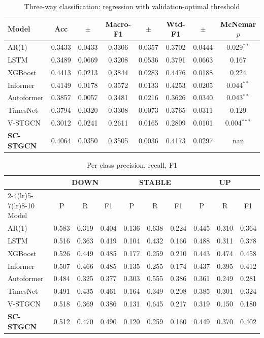 
\begin{table}[ht]\centering
\caption{Three-way classification: regression with validation-optimal threshold}
\label{tab:clf3opt}
\begin{tabular}{lccccccc}\toprule
Model & Acc & $\pm$ & Macro-F1 & $\pm$ & Wtd-F1 & $\pm$ & McNemar $p$ \\\midrule
AR(1) & 0.3433 & 0.0433 & 0.3306 & 0.0357 & 0.3702 & 0.0444 & 0.029$^{**}$ \\
LSTM & 0.3489 & 0.0669 & 0.3208 & 0.0536 & 0.3791 & 0.0663 & 0.167 \\
XGBoost & 0.4413 & 0.0213 & 0.3844 & 0.0283 & 0.4476 & 0.0188 & 0.224 \\
Informer & 0.4149 & 0.0178 & 0.3572 & 0.0133 & 0.4253 & 0.0205 & 0.044$^{**}$ \\
Autoformer & 0.3857 & 0.0057 & 0.3481 & 0.0216 & 0.3626 & 0.0340 & 0.043$^{**}$ \\
TimesNet & 0.3794 & 0.0320 & 0.3308 & 0.0073 & 0.3765 & 0.0311 & 0.129 \\
V-STGCN & 0.3012 & 0.0241 & 0.2611 & 0.0165 & 0.2809 & 0.0101 & 0.004$^{***}$ \\
\textbf{SC-STGCN} & 0.4064 & 0.0350 & 0.3505 & 0.0036 & 0.4173 & 0.0297 & nan \\
\bottomrule\end{tabular}\end{table}

\begin{table}[ht]\centering
\caption{Per-class precision, recall, F1}
\label{tab:perclass3}
\begin{tabular}{l ccc ccc ccc}\toprule
 & \multicolumn{3}{c}{DOWN} & \multicolumn{3}{c}{STABLE} & \multicolumn{3}{c}{UP} \\
\cmidrule(lr){2-4}\cmidrule(lr){5-7}\cmidrule(lr){8-10}
Model & P & R & F1 & P & R & F1 & P & R & F1 \\\midrule
AR(1) & 0.583 & 0.319 & 0.404 & 0.136 & 0.638 & 0.224 & 0.445 & 0.310 & 0.364 \\
LSTM & 0.516 & 0.363 & 0.419 & 0.104 & 0.432 & 0.166 & 0.488 & 0.311 & 0.378 \\
XGBoost & 0.526 & 0.449 & 0.485 & 0.177 & 0.259 & 0.210 & 0.443 & 0.474 & 0.458 \\
Informer & 0.507 & 0.466 & 0.485 & 0.135 & 0.255 & 0.174 & 0.437 & 0.395 & 0.412 \\
Autoformer & 0.484 & 0.325 & 0.377 & 0.303 & 0.555 & 0.386 & 0.361 & 0.249 & 0.281 \\
TimesNet & 0.491 & 0.435 & 0.461 & 0.164 & 0.349 & 0.208 & 0.385 & 0.301 & 0.324 \\
V-STGCN & 0.518 & 0.369 & 0.386 & 0.131 & 0.645 & 0.217 & 0.319 & 0.150 & 0.180 \\
\textbf{SC-STGCN} & 0.512 & 0.470 & 0.490 & 0.120 & 0.259 & 0.160 & 0.449 & 0.370 & 0.402 \\
\bottomrule\end{tabular}\end{table}

